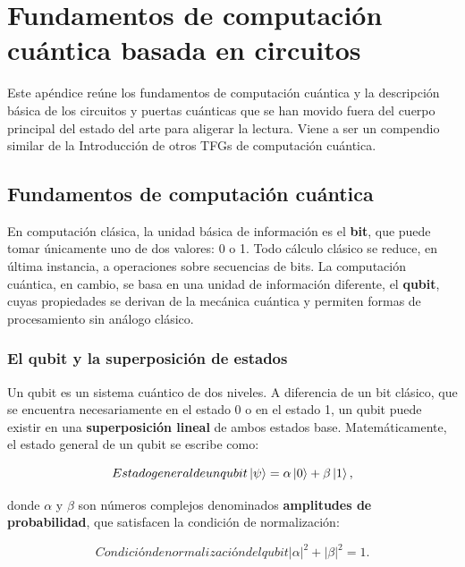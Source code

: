 \chapter{Fundamentos de computación cuántica basada en circuitos}
\label{ap:fundamentos_cuantica}

Este apéndice reúne los fundamentos de computación cuántica \cite{nielsen2010quantumcomputation} y la descripción básica de los circuitos y puertas cuánticas que se han movido fuera del cuerpo principal del estado del arte para aligerar la lectura. Viene a ser un compendio similar de la Introducción de otros TFGs de computación cuántica.

\section{Fundamentos de computación cuántica}
\label{ap:sec:fundamentos_cuantica}

En computación clásica, la unidad básica de información es el \textbf{bit}, que puede tomar únicamente uno de dos valores: 0 o 1. Todo cálculo clásico se reduce, en última instancia, a operaciones sobre secuencias de bits. La computación cuántica, en cambio, se basa en una unidad de información diferente, el \textbf{qubit}, cuyas propiedades se derivan de la mecánica cuántica y permiten formas de procesamiento sin análogo clásico.

\subsection{El qubit y la superposición de estados}
\label{ap:subsec:qubit_superposicion}

Un qubit es un sistema cuántico de dos niveles. A diferencia de un bit clásico, que se encuentra necesariamente en el estado 0 o en el estado 1, un qubit puede existir en una \textbf{superposición lineal} de ambos estados base. Matemáticamente, el estado general de un qubit se escribe como:

\begin{equation}[ap:eq:qubit]{Estado general de un qubit}
\ket{\psi} = \alpha \ket{0} + \beta \ket{1}, 
\end{equation}

donde $\alpha$ y $\beta$ son números complejos denominados \textbf{amplitudes de probabilidad}, que satisfacen la condición de normalización:

\begin{equation}[ap:eq:normalizacion]{Condición de normalización del qubit}
|\alpha|^2 + |\beta|^2 = 1.
\end{equation}

